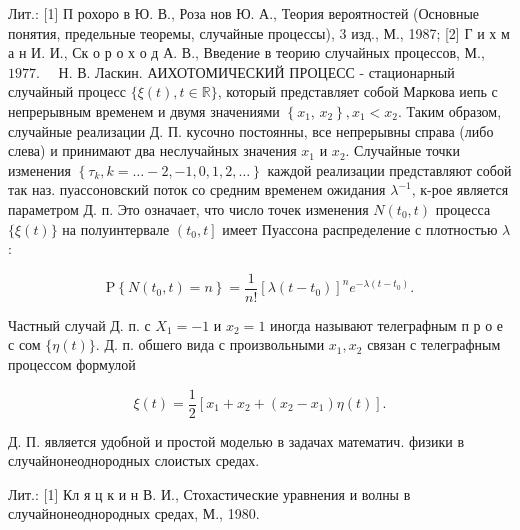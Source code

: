 \documentclass[10pt]{article}
\begin{document}
Лит.: [1] П рохоро в Ю. В., Роза нов Ю. А., Теория вероятностей (Основные понятия, предельные теоремы, случайные процессы), 3 изд., М., 1987; [2] Г и х м а н И. И., Ск о р о х о д А. В., Введение в теорию случайных процессов, М., $1977 . \quad$ Н. В. Ласкин. АИХОТОМИЧЕСКИЙ ПРОЦЕСС - стационарный случайный процесс $\{\xi(t), t \in \mathbb{R}\}$, который представляет собой Маркова иепь с непрерывным временем и двумя значениями $\left\{x_{1}\right.$, $\left.x_{2}\right\}, x_{1}<x_{2}$. Таким образом, случайные реализации Д. П. кусочно постоянны, все непрерывны справа (либо слева) и принимают два неслучайных значения $x_{1}$ и $x_{2}$. Случайные точки изменения $\left\{\tau_{k}, k=\ldots-2,-1,0,1,2, \ldots\right\}$ каждой реализации представляют собой так наз. пуассоновский поток со средним временем ожидания $\lambda^{-1}$, к-рое является параметром Д. п. Это означает, что число точек изменения $N\left(t_{0}, t\right)$ процесса $\{\xi(t)\}$ на полуинтервале $\left(t_{0}, t\right]$ имеет Пуассона распределение с плотностью $\lambda$ :



\[

\mathrm{P}\left\{N\left(t_{0}, t\right)=n\right\}=\frac{1}{n !}\left[\lambda\left(t-t_{0}\right)\right]^{n} e^{-\lambda\left(t-t_{0}\right)} .

\]



Частный случай Д. п. с $X_{1}=-1$ и $x_{2}=1$ иногда называют телеграфным п р о е с сом $\{\eta(t)\}$. Д. п. обшего вида с произвольными $x_{1}, x_{2}$ связан с телеграфным процессом формулой



\[

\xi(t)=\frac{1}{2}\left[x_{1}+x_{2}+\left(x_{2}-x_{1}\right) \eta(t)\right] .

\]



Д. П. является удобной и простой моделью в задачах математич. физики в случайнонеоднородных слоистых средах.



Лит.: [1] Кл я ц к и н В. И., Стохастические уравнения и волны в случайнонеоднородных средах, М., 1980.
\end{document}
